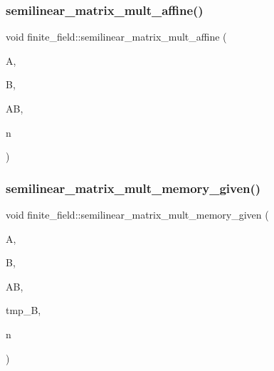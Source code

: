 \mbox{\label{classfinite__field_a90ca009a6fcaacf5cdd32aba6288d447}} 
\subsubsection{\texorpdfstring{semilinear\+\_\+matrix\+\_\+mult\+\_\+affine()}{semilinear\_matrix\_mult\_affine()}}
{\footnotesize\ttfamily void finite\+\_\+field\+::semilinear\+\_\+matrix\+\_\+mult\+\_\+affine (\begin{DoxyParamCaption}\item[{\mbox{\hyperlink{galois_8h_a09fddde158a3a20bd2dcadb609de11dc}{I\+NT}} $\ast$}]{A,  }\item[{\mbox{\hyperlink{galois_8h_a09fddde158a3a20bd2dcadb609de11dc}{I\+NT}} $\ast$}]{B,  }\item[{\mbox{\hyperlink{galois_8h_a09fddde158a3a20bd2dcadb609de11dc}{I\+NT}} $\ast$}]{AB,  }\item[{\mbox{\hyperlink{galois_8h_a09fddde158a3a20bd2dcadb609de11dc}{I\+NT}}}]{n }\end{DoxyParamCaption})}

\mbox{\label{classfinite__field_a4c953fb4054ef2dbc6a114e43428a83d}} 
\subsubsection{\texorpdfstring{semilinear\+\_\+matrix\+\_\+mult\+\_\+memory\+\_\+given()}{semilinear\_matrix\_mult\_memory\_given()}}
{\footnotesize\ttfamily void finite\+\_\+field\+::semilinear\+\_\+matrix\+\_\+mult\+\_\+memory\+\_\+given (\begin{DoxyParamCaption}\item[{\mbox{\hyperlink{galois_8h_a09fddde158a3a20bd2dcadb609de11dc}{I\+NT}} $\ast$}]{A,  }\item[{\mbox{\hyperlink{galois_8h_a09fddde158a3a20bd2dcadb609de11dc}{I\+NT}} $\ast$}]{B,  }\item[{\mbox{\hyperlink{galois_8h_a09fddde158a3a20bd2dcadb609de11dc}{I\+NT}} $\ast$}]{AB,  }\item[{\mbox{\hyperlink{galois_8h_a09fddde158a3a20bd2dcadb609de11dc}{I\+NT}} $\ast$}]{tmp\+\_\+B,  }\item[{\mbox{\hyperlink{galois_8h_a09fddde158a3a20bd2dcadb609de11dc}{I\+NT}}}]{n }\end{DoxyParamCaption})}

